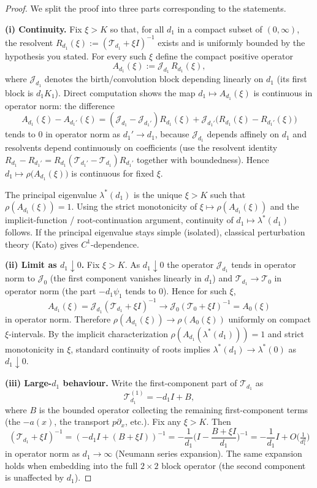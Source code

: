 \documentclass[a4paper,11pt]{amsart}
\theoremstyle{definition}
\numberwithin{equation}{section}
\theoremstyle{definition}
\begin{document}
\begin{proof}
We split the proof into three parts corresponding to the statements.

\medskip\noindent\textbf{(i) Continuity.}
Fix $\xi>K$ so that, for all $d_1$ in a compact subset of $(0,\infty)$, the resolvent
$R_{d_1}(\xi):=(\mathscr T_{d_1}+\xi I)^{-1}$ exists and is uniformly bounded by the hypothesis you stated.
For every such $\xi$ define the compact positive operator
\[
A_{d_1}(\xi):=\mathscr J_{d_1}\,R_{d_1}(\xi),
\]
where $\mathscr J_{d_1}$ denotes the birth/convolution block depending linearly on $d_1$ (its first block is $d_1K_1$).
Direct computation shows the map $d_1\mapsto A_{d_1}(\xi)$ is continuous in operator norm: the difference
\[
A_{d_1}(\xi)-A_{d_1'}(\xi)
= (\mathscr J_{d_1}-\mathscr J_{d_1'} )R_{d_1}(\xi)
+ \mathscr J_{d_1'}\big(R_{d_1}(\xi)-R_{d_1'}(\xi)\big)
\]
tends to $0$ in operator norm as $d_1'\to d_1$, because $\mathscr J_{d_1}$ depends affinely on $d_1$
and resolvents depend continuously on coefficients (use the resolvent identity
$R_{d_1}-R_{d_1'}=R_{d_1}( \mathscr T_{d_1'}-\mathscr T_{d_1})R_{d_1'}$ together with boundedness).
Hence $d_1\mapsto \rho\big(A_{d_1}(\xi)\big)$ is continuous for fixed $\xi$.

The principal eigenvalue $\lambda^\ast(d_1)$ is the unique $\xi>K$ such that
\(\rho(A_{d_1}(\xi))=1\). Using the strict monotonicity of $\xi\mapsto \rho(A_{d_1}(\xi))$
and the implicit-function / root-continuation argument, continuity of $d_1\mapsto\lambda^\ast(d_1)$ follows.
If the principal eigenvalue stays simple (isolated), classical perturbation theory (Kato) gives $C^1$-dependence.

\medskip\noindent\textbf{(ii) Limit as $d_1\downarrow0$.}
Fix $\xi>K$. As $d_1\downarrow0$ the operator $\mathscr J_{d_1}$ tends in operator norm to $\mathscr J_0$
(the first component vanishes linearly in $d_1$) and $\mathscr T_{d_1}\to\mathscr T_0$ in operator norm
(the part $-d_1\psi_1$ tends to $0$). Hence for such $\xi$,
\[
A_{d_1}(\xi)=\mathscr J_{d_1}(\mathscr T_{d_1}+\xi I)^{-1}\longrightarrow
\mathscr J_0(\mathscr T_0+\xi I)^{-1}=A_{0}(\xi)
\]
in operator norm. Therefore $\rho(A_{d_1}(\xi))\to\rho(A_{0}(\xi))$ uniformly on compact $\xi$-intervals.
By the implicit characterization $\rho(A_{d_1}(\lambda^\ast(d_1)))=1$ and strict monotonicity in
$\xi$, standard continuity of roots implies \(\lambda^\ast(d_1)\to\lambda^\ast(0)\) as $d_1\downarrow0$.

\medskip\noindent\textbf{(iii) Large-$d_1$ behaviour.}
Write the first-component part of $\mathscr T_{d_1}$ as
\[
\mathscr T_{d_1}^{(1)} = -d_1 I + B,
\]
where $B$ is the bounded operator collecting the remaining first-component terms (the $-a(x)$, the transport $p\partial_x$, etc.).  Fix any $\xi>K$. Then
\[
(\mathscr T_{d_1}+\xi I)^{-1} = (-d_1 I + (B+\xi I))^{-1}
= -\frac{1}{d_1}\Big(I - \frac{B+\xi I}{d_1}\Big)^{-1}
= -\frac{1}{d_1}I + O\!\big(\tfrac{1}{d_1^2}\big)
\]
in operator norm as $d_1\to\infty$ (Neumann series expansion). The same expansion holds when embedding into the full \(2\times2\) block operator (the second component is unaffected by \(d_1\)).


\end{proof}
\end{document}
